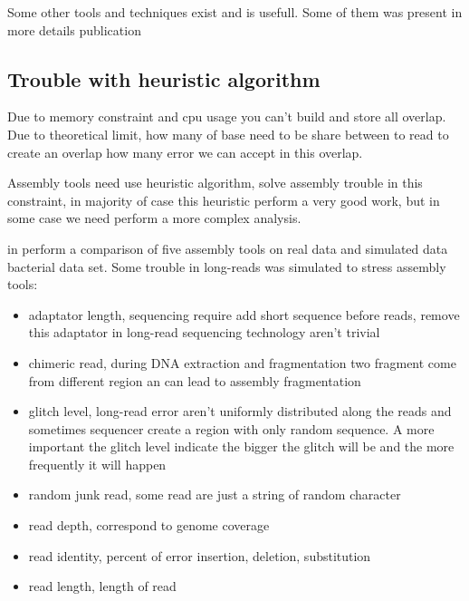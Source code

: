 \documentclass[main.tex]{subfiles}
\begin{document}
Some other tools and techniques exist and is usefull. Some of them was present in more details publication \cite{seq_assembly_demystified}



\subsection{Trouble with heuristic algorithm}

Due to memory constraint and cpu usage you can't build and store all overlap.
Due to theoretical limit, how many of base need to be share between to read to create an overlap how many error we can accept in this overlap.

Assembly tools need use heuristic algorithm, solve assembly trouble in this constraint, in majority of case this heuristic perform a very good work, but in some case we need perform a more complex analysis.

\citeauthor{long_read_assembler_comparison} in \cite{long_read_assembler_comparison} perform a comparison of five assembly tools on real data and simulated data bacterial data set. Some trouble in long-reads was simulated to stress assembly tools:
\begin{itemize}
    \item adaptator length, sequencing require add short sequence before reads, remove this adaptator in long-read sequencing technology aren't trivial
    \item chimeric read, during DNA extraction and fragmentation two fragment come from different region an can lead to assembly fragmentation
    \item glitch level, long-read error aren't uniformly distributed along the reads and sometimes sequencer create a region with only random sequence. A more important the glitch level indicate the bigger the glitch will be and the more frequently it will happen
    \item random junk read, some read are just a string of random character
    \item read depth, correspond to genome coverage
    \item read identity, percent of error insertion, deletion, substitution 
    \item read length, length of read 
\end{itemize}
\end{document}
